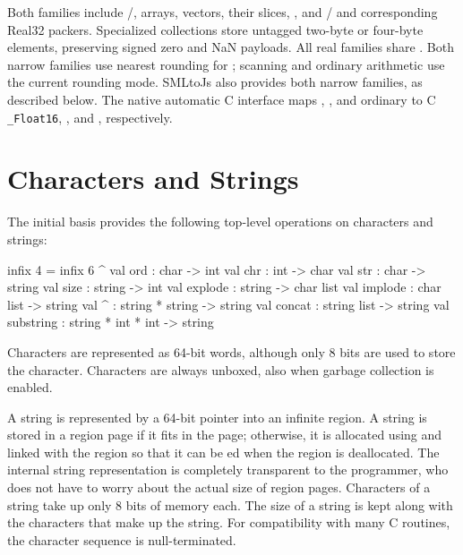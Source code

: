 \documentclass[12pt]{book}
\begin{document}
Both families include /, arrays, vectors, their slices,
, and / and corresponding
Real32 packers. Specialized collections store untagged two-byte or four-byte
elements, preserving signed zero and NaN payloads. All real families share
. Both narrow families use nearest rounding for
; scanning and
ordinary arithmetic use the current rounding mode. SMLtoJs also provides
both narrow families, as described below. The native automatic C interface maps
, , and ordinary  to
C \texttt{\_Float16}, , and , respectively.

\section{Characters and Strings}
The
%
%
initial basis provides the following top-level operations on characters and strings:
%
%
%
%
%
%
%
%
%
%
%
\begin{smlcode}
  infix         4 =
  infix         6 ^
  val ord       : char -> int
  val chr       : int -> char
  val str       : char -> string
  val size      : string -> int
  val explode   : string -> char list
  val implode   : char list -> string
  val ^         : string * string -> string
  val concat    : string list -> string
  val substring : string * int * int -> string
\end{smlcode}

\noindent
Characters are represented as 64-bit words, although only 8 bits are used to
store the character. Characters are always unboxed, also when garbage collection
is enabled.

A string is represented by a 64-bit pointer into an infinite region. A string is
stored in a region page if it fits in the page; otherwise, it is allocated using
 and linked with the region so that it can be ed
when the region is deallocated. The internal string representation is completely
transparent to the programmer, who does not have to worry about the actual size
of region pages. Characters of a string take up only 8 bits of memory each. The
size of a string is kept along with the characters that make up the string. For
compatibility with many C routines, the character sequence is null-terminated.
\end{document}
